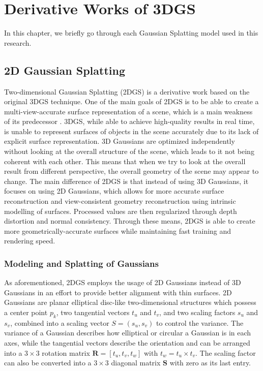 
\chapter{Derivative Works of 3DGS}\label{chapter:derivative_models}

In this chapter, we briefly go through each Gaussian Splatting model used in this research.

\section{2D Gaussian Splatting}

Two-dimensional Gaussian Splatting (2DGS) \parencite{2DGS} is a derivative work based on the original 3DGS technique. One of the main goals of 2DGS is to be able to create a multi-view-accurate surface representation of a scene, which is a main weakness of its predecessor \parencite{3DGS}. 3DGS, while able to achieve high-quality results in real time, is unable to represent surfaces of objects in the scene accurately due to its lack of explicit surface representation. 3D Gaussians are optimized independently without looking at the overall structure of the scene, which leads to it not being coherent with each other. This means that when we try to look at the overall result from different perspective, the overall geometry of the scene may appear to change. The main difference of 2DGS is that instead of using 3D Gaussians, it focuses on using 2D Gaussians, which allows for more accurate surface reconstruction and view-consistent geometry reconstruction using intrinsic modelling of surfaces. Processed values are then regularized through depth distortion and normal consistency. Through these means, 2DGS is able to create more geometrically-accurate surfaces while maintaining fast training and rendering speed.

\subsection{Modeling and Splatting of Gaussians}

As aforementioned, 2DGS employs the usage of 2D Gaussians instead of 3D Gaussians in an effort to provide better alignment with thin surfaces. 2D Gaussians are planar elliptical disc-like two-dimensional structures which possess a center point \(p_k\), two tangential vectors \(t_u\) and \(t_v\), and two scaling factors \(s_u\) and \(s_v\), combined into a scaling vector \(S = (s_u, s_v)\) to control the variance. The variance of a Gaussian describes how elliptical or circular a Gaussian is in each axes, while the tangential vectors describe the orientation and can be arranged into a \(3 \times 3\) rotation matrix \(\mathbf{R}=[t_u, t_v, t_w]\) with \(t_w = t_u \times t_v\). The scaling factor can also be converted into a \(3 \times 3\) diagonal matrix \(\mathbf{S}\) with zero as its last entry.

